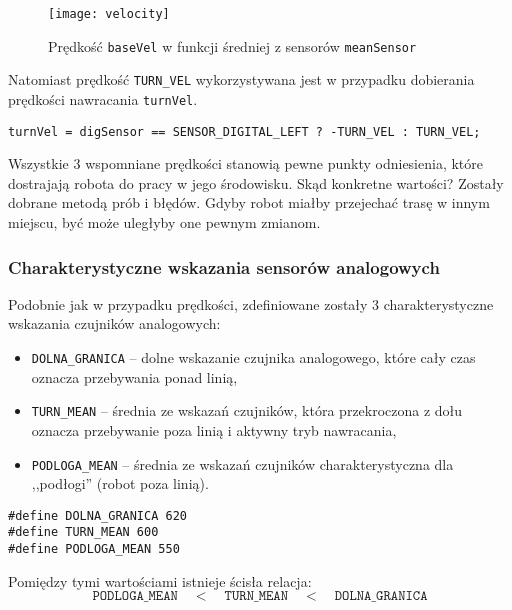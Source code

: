 \documentclass[11pt]{article}
\begin{document}
\begin{figure}[h!]
	\centering
	\texttt{[image: velocity]}
	\caption{Prędkość \texttt{baseVel} w funkcji średniej z sensorów \texttt{meanSensor} \label{fig:velocity}}
\end{figure}

\newpage

Natomiast prędkość \texttt{TURN\_VEL} wykorzystywana jest w przypadku dobierania prędkości nawracania \texttt{turnVel}.
\begin{lstlisting}[firstnumber = 122]
turnVel = digSensor == SENSOR_DIGITAL_LEFT ? -TURN_VEL : TURN_VEL;
\end{lstlisting}

Wszystkie 3 wspomniane prędkości stanowią pewne punkty odniesienia, które dostrajają robota do pracy w jego środowisku. Skąd konkretne wartości? Zostały dobrane metodą prób i błędów. Gdyby robot miałby przejechać trasę w innym miejscu, być może uległyby one pewnym zmianom.

\subsubsection{Charakterystyczne wskazania sensorów analogowych}
Podobnie jak w przypadku prędkości, zdefiniowane zostały 3 charakterystyczne wskazania czujników analogowych:
\begin{itemize}
\item \texttt{DOLNA\_GRANICA} -- dolne wskazanie czujnika analogowego, które cały czas oznacza przebywania ponad linią,
\item \texttt{TURN\_MEAN} -- średnia ze wskazań czujników, która przekroczona z dołu oznacza przebywanie poza linią i aktywny tryb nawracania,
\item \texttt{PODLOGA\_MEAN} -- średnia ze wskazań czujników charakterystyczna dla ,,podłogi'' (robot poza linią).
\end{itemize}

\begin{lstlisting}[firstnumber = 58]
#define DOLNA_GRANICA 620
#define TURN_MEAN 600
#define PODLOGA_MEAN 550
\end{lstlisting}

Pomiędzy tymi wartościami istnieje ścisła relacja:
\begin{equation*}
\texttt{PODLOGA\_MEAN} \quad < \quad \texttt{TURN\_MEAN} \quad < \quad \texttt{DOLNA\_GRANICA}
\end{equation*}
\end{document}
